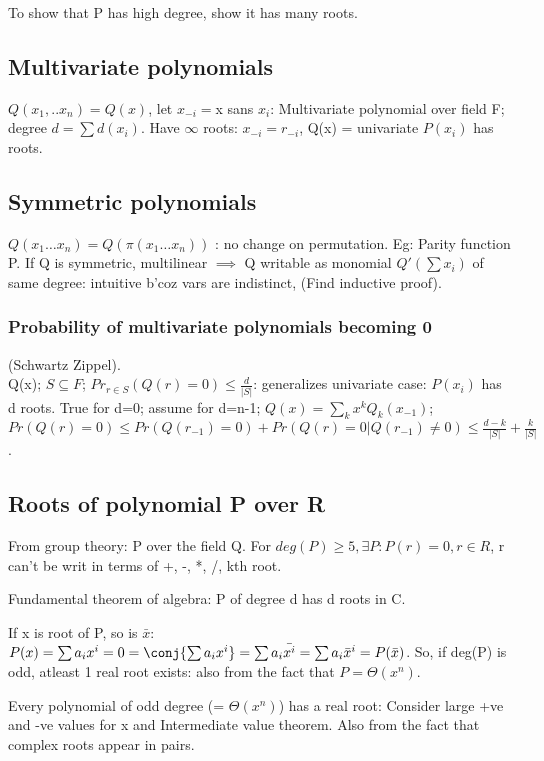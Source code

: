 \documentclass[oneside, article]{memoir}
\begin{document}
To show that P has high degree, show it has many roots.

\subsection{Multivariate polynomials}
$Q(x_{1}, .. x_{n}) = Q(x)$, let $x_{-i} = $x sans $x_{i}$: Multivariate polynomial over field F; degree $d = \sum d(x_{i})$. Have $\infty$ roots: $x_{-i} = r_{-i}$, Q(x) = univariate $P(x_{i})$ has roots.

\subsection{Symmetric polynomials}
$Q(x_{1} \dots x_{n}) = Q(\pi(x_{1} \dots x_{n}))$ : no change on permutation. Eg: Parity function P. If Q is symmetric, multilinear $\implies$ Q writable as monomial $Q'(\sum x_{i})$ of same degree: intuitive b'coz vars are indistinct, (Find inductive proof).

\subsubsection{Probability of multivariate polynomials becoming 0}
(Schwartz Zippel). \\
Q(x); $S\subseteq F$; $Pr_{r \in S}(Q(r) = 0) \leq \frac{d}{|S|}$: generalizes univariate case: $P(x_{i})$ has d roots. True for d=0; assume for d=n-1; $Q(x) = \sum_{k} x^{k}Q_{k}(x_{-1})$; $Pr(Q(r) = 0) \leq Pr(Q(r_{-1}) = 0) + Pr(Q(r)=0 | Q(r_{-1}) \neq 0) \leq \frac{d-k}{|S|} + \frac{k}{|S|}$.

\subsection{Roots of polynomial P over R}
From group theory: P over the field Q. For $deg(P) \geq 5, \exists P: P(r)=0, r \in R$, r can't be writ in terms of +, -, *, /, kth root. \why

Fundamental theorem of algebra: P of degree d has d roots in C. \why

If x is root of P, so is $\bar{x}$: $P(x) = \sum a_{i}x^{i} = 0 = \conj{\sum a_{i}x^{i}} = \sum a_{i}\bar{x^{i}} = \sum a_{i}\bar{x}^{i} = P(\bar{x})$. So, if deg(P) is odd, atleast 1 real root exists: also from the fact that $P = \Theta(x^{n})$.

Every polynomial of odd degree (= $\Theta(x^{n})$) has a real root: Consider large +ve and -ve values for x and Intermediate value theorem. Also from the fact that complex roots appear in pairs.
\end{document}
